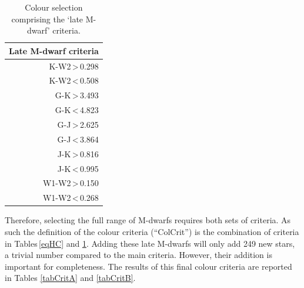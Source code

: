 \begin{table}[]
    \centering
    \begin{tabular}{|r|}
        \hline
        Late M-dwarf criteria\\
        \hline
        K-W2\,\textgreater\,0.298\\
        K-W2\,\textless\,0.508\\
        G-K\,\textgreater\,3.493\\
        G-K\,\textless\,4.823\\
        G-J\,\textgreater\,2.625\\
        G-J\,\textless\,3.864\\
        J-K\,\textgreater\,0.816\\
        J-K\,\textless\,0.995\\
	    W1-W2\,\textgreater\,0.150\\
        W1-W2\,\textless\,0.268\\
        \hline
    \end{tabular}
    \caption{Colour selection comprising the `late M-dwarf' criteria.}
    \label{eqLM}
\end{table}

Therefore, selecting the full range of M-dwarfs requires both sets of criteria. As such the definition of the colour criteria (``ColCrit'') is the combination of criteria in Tables\,\ref{eqHC} and \ref{eqLM}. Adding these late M-dwarfs will only add 249 new stars, a trivial number compared to the main criteria. However, their addition is important for completeness. The results of this final colour criteria are reported in Tables \ref{tabCritA} and \ref{tabCritB}.\\

